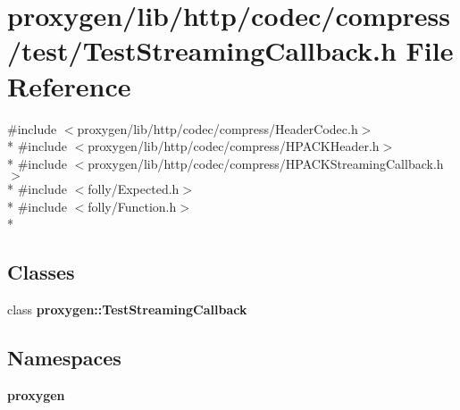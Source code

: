 \section{proxygen/lib/http/codec/compress/test/\+Test\+Streaming\+Callback.h File Reference}
\label{TestStreamingCallback_8h}
{\ttfamily \#include $<$proxygen/lib/http/codec/compress/\+Header\+Codec.\+h$>$}\\*
{\ttfamily \#include $<$proxygen/lib/http/codec/compress/\+H\+P\+A\+C\+K\+Header.\+h$>$}\\*
{\ttfamily \#include $<$proxygen/lib/http/codec/compress/\+H\+P\+A\+C\+K\+Streaming\+Callback.\+h$>$}\\*
{\ttfamily \#include $<$folly/\+Expected.\+h$>$}\\*
{\ttfamily \#include $<$folly/\+Function.\+h$>$}\\*
\subsection*{Classes}
\begin{DoxyCompactItemize}
\item 
class {\bf proxygen\+::\+Test\+Streaming\+Callback}
\end{DoxyCompactItemize}
\subsection*{Namespaces}
\begin{DoxyCompactItemize}
\item 
 {\bf proxygen}
\end{DoxyCompactItemize}
